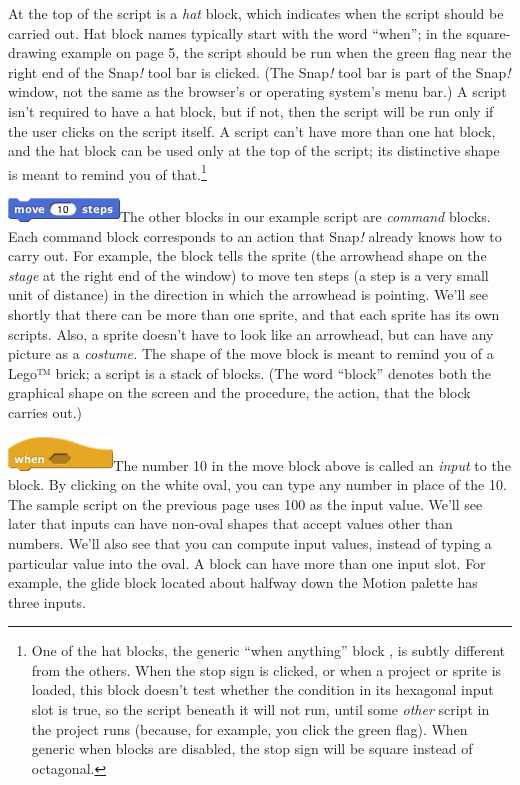 At the top of the script is a \emph{hat} block, which indicates when the
script should be carried out. Hat block names typically start with the
word ``when''; in the square-drawing example on page 5, the script
should be run when the green flag near the right end of the Snap\emph{!}
tool bar is clicked. (The Snap\emph{!} tool bar is part of the
Snap\emph{!} window, not the same as the browser's or operating system's
menu bar.) A script isn't required to have a hat block, but if not, then
the script will be run only if the user clicks on the script itself. A
script can't have more than one hat block, and the hat block can be used
only at the top of the script; its distinctive shape is meant to remind
you of that.\footnote{One of the hat blocks, the generic ``when
  anything'' block , is subtly different from the others. When the stop
  sign is clicked, or when a project or sprite is loaded, this block
  doesn't test whether the condition in its hexagonal input slot is
  true, so the script beneath it will not run, until some \emph{other}
  script in the project runs (because, for example, you click the green
  flag). When generic when blocks are disabled, the stop sign will be
  square instead of octagonal.}\label{generic_when}{}

\includegraphics[width=1.16667in,height=0.25in]{media/image9.png}The
other blocks in our example script are \emph{command} blocks. Each
command block corresponds to an action that Snap\emph{!} already knows
how to carry out. For example, the block tells the sprite (the arrowhead
shape on the \emph{stage} at the right end of the window) to move ten
steps (a step is a very small unit of distance) in the direction in
which the arrowhead is pointing. We'll see shortly that there can be
more than one sprite, and that each sprite has its own scripts. Also, a
sprite doesn't have to look like an arrowhead, but can have any picture
as a \emph{costume.} The shape of the move block is meant to remind you
of a Lego™ brick; a script is a stack of blocks. (The word ``block''
denotes both the graphical shape on the screen and the procedure, the
action, that the block carries out.)

\includegraphics[width=1.09722in,height=0.35417in]{media/image10.png}The
number 10 in the move block above is called an \emph{input} to the
block. By clicking on the white oval, you can type any number in place
of the 10. The sample script on the previous page uses 100 as the input
value. We'll see later that inputs can have non-oval shapes that accept
values other than numbers. We'll also see that you can compute input
values, instead of typing a particular value into the oval. A block can
have more than one input slot. For example, the glide block located
about halfway down the Motion palette has three inputs.

